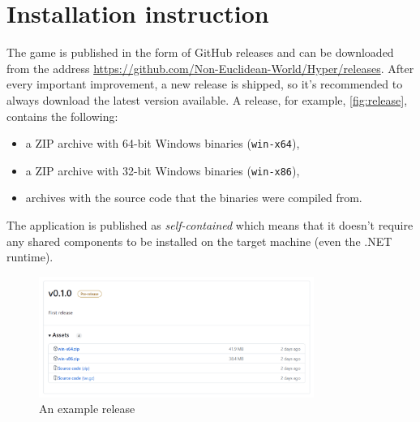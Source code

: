 \section{Installation instruction}
The game is published in the form of GitHub releases and can be downloaded from the address \url{https://github.com/Non-Euclidean-World/Hyper/releases}.
After every important improvement, a new release is shipped, so it's recommended to always download the latest version available.
A release, for example, \autoref{fig:release}, contains the following:
\begin{itemize}
    \item a ZIP archive with 64-bit Windows binaries (\texttt{win-x64}),
    \item a ZIP archive with 32-bit Windows binaries (\texttt{win-x86}),
    \item archives with the source code that the binaries were compiled from.
\end{itemize}

The application is published as \textit{self-contained} which means that it doesn't require any shared components to be installed on the target machine (even the .NET runtime).

\begin{figure}[H]
    \centering
    \includegraphics[width=0.8\textwidth]{sections/installation_instruction/resources/release-download.png}
    \caption{An example release}
    \label{fig:release}
\end{figure}